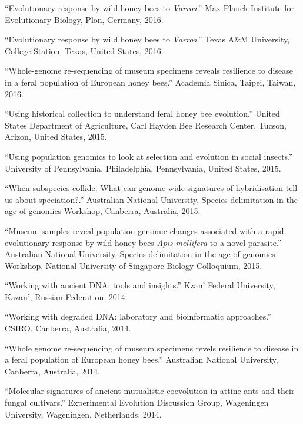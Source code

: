 \documentclass[11pt]{article}
\def\printdate#1{\xprintdate#1-}
\def\xprintdate#1-#2-#3-{#1}
\begin{document}
\ind ``Evolutionary response by wild honey bees to \textit{Varroa}.'' Max Planck Institute for Evolutionary Biology, Plön, Germany, \printdate{2016-00-00}.


\ind ``Evolutionary response by wild honey bees to \textit{Varroa}.'' Texas A\&M University, College Station, Texas, United States, \printdate{2016-00-00}.


\ind ``Whole-genome re-sequencing of museum specimens reveals resilience to
disease in a feral population of European honey bees.'' Academia Sinica, Taipei, Taiwan, \printdate{2016-00-00}.


\ind ``Using historical collection to understand feral honey bee evolution.'' United States Department of Agriculture, Carl Hayden Bee Research Center, Tucson, Arizon, United States, \printdate{2015-00-00}.


\ind ``Using population genomics to look at selection and evolution in social
insects.'' University of Pennsylvania, Philadelphia, Pennsylvania, United States, \printdate{2015-00-00}.


\ind ``When subspecies collide: What can genome-wide signatures of
hybridisation tell us about speciation?.'' Australian National University, Species delimitation in the age of
genomics Workshop, Canberra, Australia, \printdate{2015-00-00}.


\ind ``Museum samples reveal population genomic changes associated with a rapid
evolutionary response by wild honey bees \textit{Apis mellifera} to a
novel parasite.'' Australian National University, Species delimitation in the age of
genomics Workshop, National University of Singapore Biology Colloquium, \printdate{2015-00-00}.


\ind ``Working with ancient DNA: tools and insights.'' Kzan' Federal University, Kazan', Russian Federation, \printdate{2014-00-00}.


\ind ``Working with degraded DNA: laboratory and bioinformatic approaches.'' CSIRO, Canberra, Australia, \printdate{2014-00-00}.


\ind ``Whole genome re-sequencing of museum specimens revels resilience to
disease in a feral population of European honey bees.'' Australian National University, Canberra, Australia, \printdate{2014-00-00}.



\ind ``Molecular signatures of ancient mutualistic coevolution in attine ants
and their fungal cultivars.'' Experimental Evolution Discussion Group, Wageningen University, Wageningen, Netherlands, \printdate{2014-00-00}.
\end{document}
